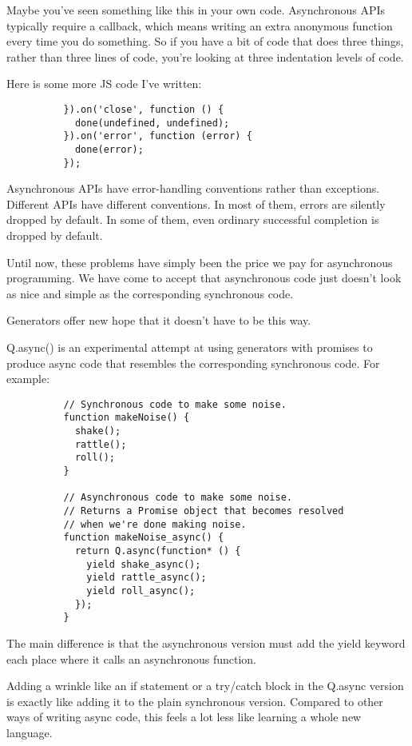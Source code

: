         Maybe you've seen something like this in your own code. Asynchronous APIs typically require a callback, which means writing an extra anonymous function every time you do something. So if you have a bit of code that does three things, rather than three lines of code, you're looking at three indentation levels of code.

        Here is some more JS code I've written:

        \begin{lstlisting}
          }).on('close', function () {
            done(undefined, undefined);
          }).on('error', function (error) {
            done(error);
          });
        \end{lstlisting}

        Asynchronous APIs have error-handling conventions rather than exceptions. Different APIs have different conventions. In most of them, errors are silently dropped by default. In some of them, even ordinary successful completion is dropped by default.

        Until now, these problems have simply been the price we pay for asynchronous programming. We have come to accept that asynchronous code just doesn't look as nice and simple as the corresponding synchronous code.

        Generators offer new hope that it doesn't have to be this way.

        Q.async() is an experimental attempt at using generators with promises to produce async code that resembles the corresponding synchronous code. For example:

        \begin{lstlisting}
          // Synchronous code to make some noise.
          function makeNoise() {
            shake();
            rattle();
            roll();
          }

          // Asynchronous code to make some noise.
          // Returns a Promise object that becomes resolved
          // when we're done making noise.
          function makeNoise_async() {
            return Q.async(function* () {
              yield shake_async();
              yield rattle_async();
              yield roll_async();
            });
          }
        \end{lstlisting}

        The main difference is that the asynchronous version must add the yield keyword each place where it calls an asynchronous function.

        Adding a wrinkle like an if statement or a try/catch block in the Q.async version is exactly like adding it to the plain synchronous version. Compared to other ways of writing async code, this feels a lot less like learning a whole new language.

